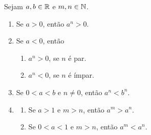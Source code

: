 \begin{corollary}
    Sejam $a,b \in \mathbb{R}$ e $m,n \in \mathbb{N}$.
        \begin{enumerate}[leftmargin=*, align=left, label=\textbf{(\alph*)}]
            \item Se $a > 0$, então $a^n > 0$.
            \item Se $a < 0$, então
                \begin{enumerate}[label=\roman*.]
                    \item $a^n > 0$, se $n$ é par.
                    \item $a^n < 0$, se $n$ é ímpar.
                \end{enumerate}
            \item Se $0 < a < b$ e $n \neq 0$, então $a^n < b^n$.
            \item
                \begin{enumerate}[label=\roman*.]
                    \item Se $a > 1$ e $m>n$, então $a^m > a^n$.
                    \item Se $0 < a < 1$ e $m>n$, então $a^m < a^n$.
                \end{enumerate}
        \end{enumerate}
\end{corollary}

